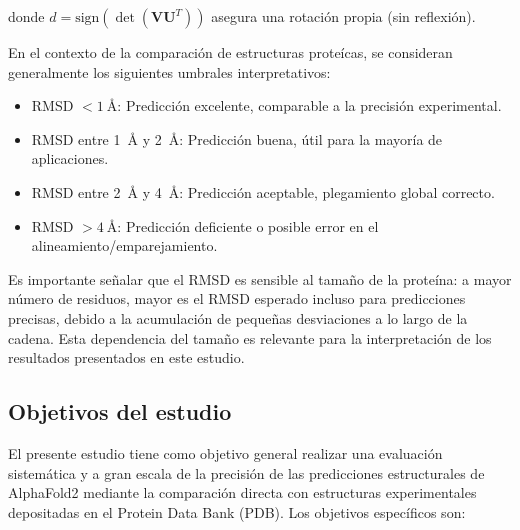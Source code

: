 \noindent donde $d = \text{sign}(\det(\mathbf{V}\mathbf{U}^T))$ asegura una rotaci\'on propia (sin reflexi\'on).

En el contexto de la comparaci\'on de estructuras prote\'icas, se consideran generalmente los siguientes umbrales interpretativos:

\begin{itemize}
    \item RMSD $< \SI{1}{\angstrom}$: Predicci\'on excelente, comparable a la precisi\'on experimental.
    \item RMSD entre \SI{1}{\angstrom} y \SI{2}{\angstrom}: Predicci\'on buena, \'util para la mayor\'ia de aplicaciones.
    \item RMSD entre \SI{2}{\angstrom} y \SI{4}{\angstrom}: Predicci\'on aceptable, plegamiento global correcto.
    \item RMSD $> \SI{4}{\angstrom}$: Predicci\'on deficiente o posible error en el alineamiento/emparejamiento.
\end{itemize}

Es importante se\~nalar que el RMSD es sensible al tama\~no de la prote\'ina: a mayor n\'umero de residuos, mayor es el RMSD esperado incluso para predicciones precisas, debido a la acumulaci\'on de peque\~nas desviaciones a lo largo de la cadena. Esta dependencia del tama\~no es relevante para la interpretaci\'on de los resultados presentados en este estudio.

\subsection{Objetivos del estudio}
\label{subsec:objetivos}

El presente estudio tiene como objetivo general realizar una evaluaci\'on sistem\'atica y a gran escala de la precisi\'on de las predicciones estructurales de AlphaFold2 mediante la comparaci\'on directa con estructuras experimentales depositadas en el Protein Data Bank (PDB). Los objetivos espec\'ificos son:

